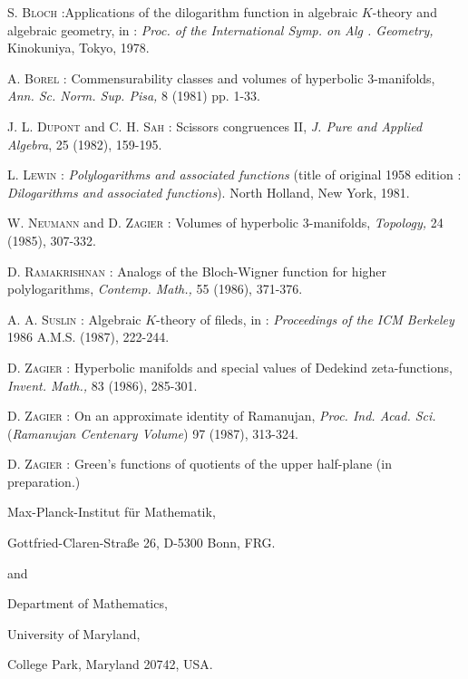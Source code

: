 \begin{thebibliography}{99}
 \textsc{S. Bloch :}\pageoriginale Applications of the dilogarithm function in algebraic $K$-theory and algebraic geometry, in : {\em Proc. of the International Symp. on Alg . Geometry,} Kinokuniya, Tokyo, 1978.

 \textsc{A. Borel :} Commensurability classes and volumes of hyperbolic 3-manifolds, {\em Ann. Sc. Norm. Sup. Pisa,} 8 (1981) pp. 1-33.

 \textsc{J. L. Dupont} and \textsc{C. H. Sah :} Scissors congruences II, {\em J. Pure and Applied Algebra}, 25 (1982), 159-195.

 \textsc{L. Lewin :} {\em Polylogarithms and associated functions} (title of original 1958 edition : {\em Dilogarithms and associated functions}). North Holland, New York, 1981.

 \textsc{W. Neumann} and \textsc{D. Zagier :} Volumes of hyperbolic 3-manifolds, {\em Topology,} 24 (1985), 307-332.

 \textsc{D. Ramakrishnan :} Analogs of the Bloch-Wigner function for higher polylogarithms, {\em Contemp. Math.,} 55 (1986), 371-376.

 \textsc{A. A. Suslin :} Algebraic $K$-theory of fileds, in : {\em Proceedings of the ICM Berkeley} 1986 A.M.S. (1987), 222-244.

 \textsc{D. Zagier :} Hyperbolic manifolds and special values of Dedekind zeta-functions, {\em Invent. Math.,} 83 (1986), 285-301.

 \textsc{D. Zagier :} On an approximate identity of Ramanujan, {\em Proc. Ind. Acad. Sci.} ({\em Ramanujan Centenary Volume}) 97 (1987), 313-324.

 \textsc{D. Zagier :} Green's functions of quotients of the upper half-plane (in preparation.)
\end{thebibliography}

\bigskip
\noindent
{\small Max-Planck-Institut f\"ur Mathematik},

\noindent
{\small Gottfried-Claren-Stra{\ss}e 26, D-5300 Bonn, FRG.}

\medskip
\noindent
{\small and}
\medskip

\noindent
{\small Department of Mathematics},

\noindent
{\small University of Maryland,}

\noindent
{\small College Park, Maryland 20742, USA.}




